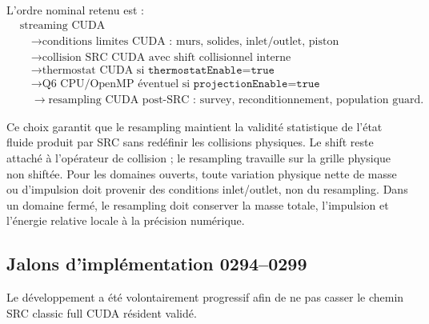 \documentclass[11pt,a4paper]{article}
\begin{document}
L'ordre nominal retenu est :
\begin{equation}
\begin{aligned}
&\text{streaming CUDA} \\
&\quad \to \text{conditions limites CUDA : murs, solides, inlet/outlet, piston} \\
&\quad \to \text{collision SRC CUDA avec shift collisionnel interne} \\
&\quad \to \text{thermostat CUDA si } \texttt{thermostatEnable=true} \\
&\quad \to \text{Q6 CPU/OpenMP éventuel si } \texttt{projectionEnable=true} \\
&\quad \to \text{resampling CUDA post-SRC : survey, reconditionnement, population guard}.
\end{aligned}
\end{equation}

Ce choix garantit que le resampling maintient la validité statistique de l'état fluide produit par SRC sans redéfinir les collisions physiques. Le shift reste attaché à l'opérateur de collision ; le resampling travaille sur la grille physique non shiftée. Pour les domaines ouverts, toute variation physique nette de masse ou d'impulsion doit provenir des conditions inlet/outlet, non du resampling. Dans un domaine fermé, le resampling doit conserver la masse totale, l'impulsion et l'énergie relative locale à la précision numérique.

\subsection{Jalons d'implémentation 0294--0299}

Le développement a été volontairement progressif afin de ne pas casser le chemin SRC classic full CUDA résident validé.
\end{document}
